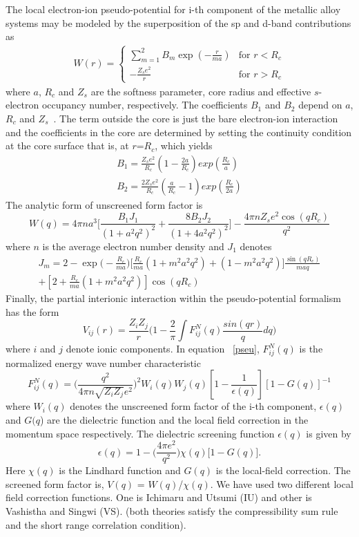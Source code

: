 \documentclass[final12pt]{elsarticle}
\newcommand{\be}{\begin{equation}}
\newcommand{\ee}{\end{equation}}
\newcommand{\bea}{\begin{eqnarray}}
\newcommand{\eea}{\end{eqnarray}}
\begin{document}
The local electron-ion pseudo-potential for i-th component of the metallic alloy systems may be modeled by the superposition of the sp and d-band contributions as
\bea
W(r) = \left\{ \begin{array}{ll}
\sum_{m=1}^{2}B_{m}\exp(-\frac{r}{ma}) & \mbox{for $r < R_{c}$} \\
-\frac{Z_{s}e^{2}}{r} & \mbox {for $r > R_{c}$}\end{array}\right.
\eea
where $a$, $R_{c}$ and $Z_{s}$ are the softness parameter, core radius
and effective $s$-electron occupancy number, respectively. The coefficients $B_1$ and $B_2$ depend on $a$, $R_{c}$ and $Z_{s}$~\cite{Bhuiyan1992}. 
The term outside the core is just the bare electron-ion interaction and the coefficients in the core are determined by setting the continuity condition at the core surface that is, at $r$=$R_{c}$, which yields
\bea
B_{1}=\frac{Z_{s}e^{2}}{R_{c}}(1-\frac{2a}{R_{c}})exp(\frac{R_{c}}{a}) \nonumber\\
B_{2}=\frac{2Z_{s}e^{2}}{R_{c}}(\frac{a}{R_{c}}-1)exp(\frac{R_{c}}{2a})
\eea
The analytic form of unscreened form factor is
\be
W(q)=4\pi na^{3}\Bigg[\frac{B_{1}J_{1}}{(1+a^{2}q^{2})^{2}}+\frac{8B_{2}J_{2}}{(1+4a^{2}q^{2})^{2}}\Bigg]-\frac{4\pi n Z_{s}e^{2}\cos(qR_{c})}{q^{2}}
\ee
where $n$ is the average electron number density and $J_1$ denotes
\bea
J_{m}=2-\exp\bigg(-\frac{R_{c}}{ma}\bigg)\bigg[\frac{R_{c}}{ma}(1+m^{2}a^{2}q^{2})+(1-m^{2}a^{2}q^{2})\bigg]\frac{\sin(qR_{c})}{maq}\\ \nonumber
+[2+\frac{R_{c}}{ma}(1+m^{2}a^{2}q^{2})]\cos(qR_{c})
\eea
Finally, the partial interionic interaction within the pseudo-potential formalism has the form
\be
\label{pseu}
V_{ij}(r)=\frac{Z_{i}Z_{j}}{r}\bigg(1-\frac{2}{\pi}\int F^{N}_{ij}(q)\frac{sin(qr)}{q}dq\bigg)
\ee
where $i$ and $j$ denote ionic components. In equation ~\ref{pseu}, $F_{ij}^{N}(q)$ is the normalized energy wave number characteristic
\be
F^{N}_{ij}(q)=\bigg(\frac{q^{2}}{4\pi n \sqrt{Z_{i}Z_{j}}e^{2}}\bigg)^{2}W_{i}(q)W_{j}(q)[1-\frac{1}{\epsilon(q)}][1-G(q)]^{-1}
\ee
where $W_i(q)$ denotes the unscreened form factor of the i-th component, $\epsilon(q)$ and $G(q$) are the dielectric function and the local field correction in the momentum space respectively. The dielectric screening function $\epsilon(q)$ is given by
\be
\epsilon(q)=1-\Bigg(\frac{4\pi e^{2}}{q^{2}}\Bigg)\chi(q)\Big[1-G(q)\Big].
\ee
Here $\chi(q)$ is the Lindhard function and $G(q)$ is the local-field correction. The screened form factor is, $V(q)$ = $W(q)$/$\chi(q)$. We have used two different local field correction functions. One is Ichimaru and Utsumi (IU) and other is Vashistha
and Singwi (VS). (both theories satisfy the compressibility sum rule and the short
range correlation condition).
\end{document}
